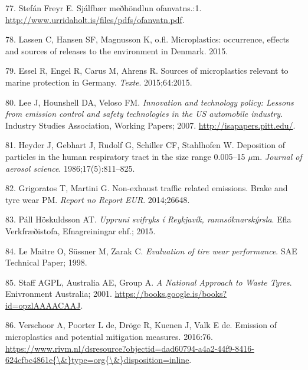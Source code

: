 \documentclass[icelandic,]{book}
\begin{document}
\leavevmode\hypertarget{ref-StefanFreyr}{}%
77. Stefán Freyr E. Sjálfbær meðhöndlun ofanvatns.:1. \url{http://www.urridaholt.is/files/pdfs/ofanvatn.pdf}.

\leavevmode\hypertarget{ref-lassen2015microplastics}{}%
78. Lassen C, Hansen SF, Magnusson K, o.fl. Microplastics: occurrence, effects and sources of releases to the environment in Denmark. 2015.

\leavevmode\hypertarget{ref-essel2015sources}{}%
79. Essel R, Engel R, Carus M, Ahrens R. Sources of microplastics relevant to marine protection in Germany. \emph{Texte}. 2015;64:2015.

\leavevmode\hypertarget{ref-lee2007innovation}{}%
80. Lee J, Hounshell DA, Veloso FM. \emph{Innovation and technology policy: Lessons from emission control and safety technologies in the US automobile industry}. Industry Studies Association, Working Papers; 2007. \url{http://isapapers.pitt.edu/}.

\leavevmode\hypertarget{ref-heyder1986deposition}{}%
81. Heyder J, Gebhart J, Rudolf G, Schiller CF, Stahlhofen W. Deposition of particles in the human respiratory tract in the size range 0.005--15 \(\mu\)m. \emph{Journal of aerosol science}. 1986;17(5):811--825.

\leavevmode\hypertarget{ref-grigoratos2014non}{}%
82. Grigoratos T, Martini G. Non-exhaust traffic related emissions. Brake and tyre wear PM. \emph{Report no Report EUR}. 2014;26648.

\leavevmode\hypertarget{ref-Efla2015}{}%
83. Páll Höskuldsson AT. \emph{Uppruni svifryks í Reykjavík, rannsóknarskýrsla}. Efla Verkfræðistofa, Efnagreiningar ehf.; 2015.

\leavevmode\hypertarget{ref-le1998evaluation}{}%
84. Le Maitre O, Süssner M, Zarak C. \emph{Evaluation of tire wear performance}. SAE Technical Paper; 1998.

\leavevmode\hypertarget{ref-atech2001national}{}%
85. Staff AGPL, Australia AE, Group A. \emph{A National Approach to Waste Tyres}. Enivronment Australia; 2001. \url{https://books.google.is/books?id=opzlAAAACAAJ}.

\leavevmode\hypertarget{ref-Verschoor2016}{}%
86. Verschoor A, Poorter L de, Dröge R, Kuenen J, Valk E de. Emission of microplastics and potential mitigation measures. 2016:76. \href{https://www.rivm.nl/dsresource?objectid=dad60794-a4a2-44f9-8416-624cfbc4861e\%7B/\&\%7Dtype=org\%7B/\&\%7Ddisposition=inline}{https://www.rivm.nl/dsresource?objectid=dad60794-a4a2-44f9-8416-624cfbc4861e\{\textbackslash{}\&\}type=org\{\textbackslash{}\&\}disposition=inline}.
\end{document}
